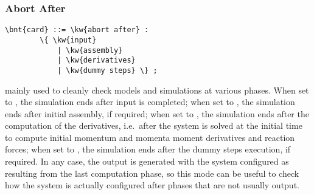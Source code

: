 \subsubsection{Abort After}
\label{sec:IVP:abort after}
\begin{Verbatim}[commandchars=\\\{\}]
    \bnt{card} ::= \kw{abort after} :
        \{ \kw{input} 
            | \kw{assembly}
            | \kw{derivatives}
            | \kw{dummy steps} \} ;
\end{Verbatim}
mainly used to cleanly check models and simulations at various phases.
When set to , the simulation ends after input is completed;
when set to , the simulation ends after initial assembly,
if required;
when set to , the simulation ends after the computation
of the derivatives, i.e.\ after the system is solved at the initial
time to compute initial momentum and momenta moment derivatives and 
reaction forces;
when set to , the simulation ends after the dummy steps
execution, if required.
In any case, the output is generated with the system configured 
as resulting from the last computation phase, so this mode can be useful 
to check how the system is actually configured after phases that are not 
usually output.


